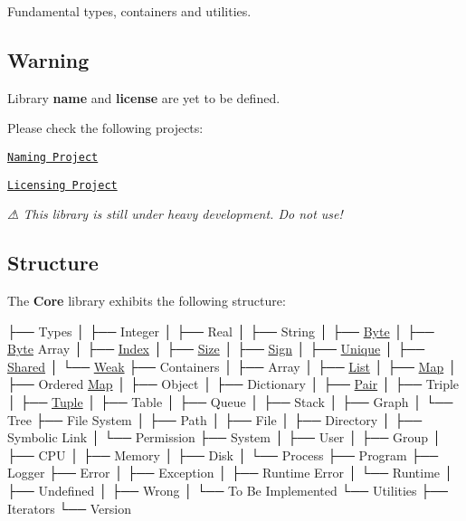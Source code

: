 \href{https://travis-ci.org/open-space-collective/library-core}{\tt } \href{https://codecov.io/gh/open-space-collective/library-core}{\tt } \href{https://open-space-collective.github.io/library-core}{\tt }

Fundamental types, containers and utilities.

\subsection*{Warning}

Library {\bfseries name} and {\bfseries license} are yet to be defined.

Please check the following projects\+:


\begin{DoxyItemize}
\item \href{https://github.com/orgs/open-space-collective/projects/1}{\tt Naming Project}
\item \href{https://github.com/orgs/open-space-collective/projects/2}{\tt Licensing Project}
\end{DoxyItemize}

{\itshape ⚠ This library is still under heavy development. Do not use!}

\subsection*{Structure}

The {\bfseries Core} library exhibits the following structure\+:


\begin{DoxyCode}
├── Types
│   ├── Integer
│   ├── Real
│   ├── String
│   ├── \hyperlink{_byte_8hpp_ae37635b89098069fb3b8c5181edd0945}{Byte}
│   ├── \hyperlink{_byte_8hpp_ae37635b89098069fb3b8c5181edd0945}{Byte} Array
│   ├── \hyperlink{_index_8hpp_ad87eeb821d7067ec94e06ed1980d6350}{Index}
│   ├── \hyperlink{_size_8hpp_a701626ea1027888ebbb8cfd0ff7adab0}{Size}
│   ├── \hyperlink{_sign_8hpp_a06d9eaa410d43a0fa3f383040618e87d}{Sign}
│   ├── \hyperlink{_unique_8hpp_ac12d38691838fbc9a36765ee62ace52a}{Unique}
│   ├── \hyperlink{_shared_8hpp_a3dae1a00f899bac0366794fa85eda8ee}{Shared}
│   └── \hyperlink{_weak_8hpp_a26c13c272f9fba4ce17ee4980be6703c}{Weak}
├── Containers
│   ├── Array
│   ├── \hyperlink{_list_8hpp_a87ccf40619002299b341a5e76e989912}{List}
│   ├── \hyperlink{_map_8hpp_a248e088a0b4ec44aff451a5c3663dcee}{Map}
│   ├── Ordered \hyperlink{_map_8hpp_a248e088a0b4ec44aff451a5c3663dcee}{Map}
│   ├── Object
│   ├── Dictionary
│   ├── \hyperlink{_pair_8hpp_aad6f8de4c0f279c10436d59d4ace74bd}{Pair}
│   ├── Triple
│   ├── \hyperlink{_tuple_8hpp_a551ef72e2adb570c4d6bdf5e1bbc96b9}{Tuple}
│   ├── Table
│   ├── Queue
│   ├── Stack
│   ├── Graph
│   └── Tree
├── File System
│   ├── Path
│   ├── File
│   ├── Directory
│   ├── Symbolic Link
│   └── Permission
├── System
│   ├── User
│   ├── Group
│   ├── CPU
│   ├── Memory
│   ├── Disk
│   └── Process
├── Program
├── Logger
├── Error
│   ├── Exception
│   ├── Runtime Error
│   └── Runtime
│       ├── Undefined
│       ├── Wrong
│       └── To Be Implemented
└── Utilities
    ├── Iterators
    └── Version
\end{DoxyCode}


